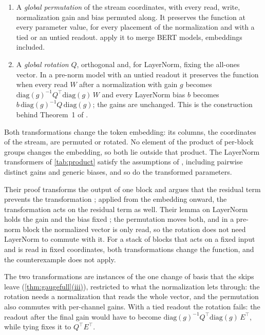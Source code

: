 \documentclass[10pt]{article}
\theoremstyle{definition}
\theoremstyle{remark}
\DeclareRobustCommand{\cpref}[2]{\hyperref[#1:#2]{\cref*{#1}(#2)}}
\begin{document}
\begin{enumerate}
\item A \emph{global permutation} of the stream coordinates, with every read, write, normalization gain and bias permuted along. It preserves the function at every parameter value, for every placement of the normalization and with a tied or an untied readout. \citet[Section~3.3]{verma2024merging} apply it to merge BERT models, embeddings included.
\item A \emph{global rotation} $Q$, orthogonal and, for LayerNorm, fixing the all-ones vector. In a pre-norm model with an untied readout it preserves the function when every read $W$ after a normalization with gain $g$ becomes $\mathrm{diag}(g)^{-1}Q^\top\mathrm{diag}(g)\,W$ and every LayerNorm bias $b$ becomes $b\,\mathrm{diag}(g)^{-1}Q\,\mathrm{diag}(g)$; the gains are unchanged. This is the construction behind Theorem~1 of \citet{ashkboos2024slicegpt}.
\end{enumerate}
Both transformations change the token embedding: its columns, the coordinates of the stream, are permuted or rotated. No element of the product of per-block groups changes the embedding, so both lie outside that product. The LayerNorm transformers of \cref{tab:product} satisfy the assumptions of \citet{wang2025gauge}, including pairwise distinct gains and generic biases, and so do the transformed parameters.

Their proof transforms the output of one block and argues that the residual term prevents the transformation \citep[Theorem~30]{wang2025gauge}; applied from the embedding onward, the transformation acts on the residual term as well. Their lemma on LayerNorm holds the gain and the bias fixed \citep[Lemma~26]{wang2025gauge}; the permutation moves both, and in a pre-norm block the normalized vector is only read, so the rotation does not need LayerNorm to commute with it. For a stack of blocks that acts on a fixed input and is read in fixed coordinates, both transformations change the function, and the counterexample does not apply.

The two transformations are instances of the one change of basis that the skips leave (\cpref{thm:gaugefull}{iii}), restricted to what the normalization lets through: the rotation needs a normalization that reads the whole vector, and the permutation also commutes with per-channel gains. With a tied readout the rotation fails: the readout after the final gain would have to become $\mathrm{diag}(g)^{-1}Q^\top\mathrm{diag}(g)\,E^\top$, while tying fixes it to $Q^\top E^\top$.
\end{document}
